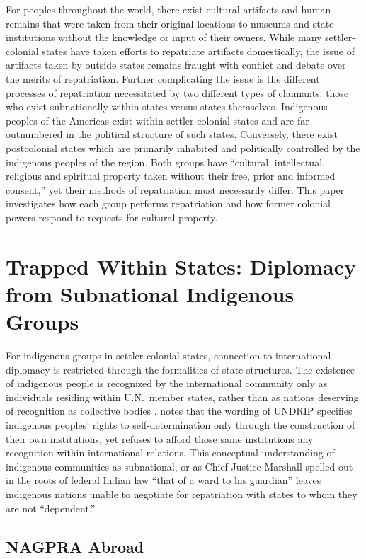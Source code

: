 \documentclass[american]{../../../coursework}
\begin{document}
For peoples throughout the world, there exist cultural artifacts and human
remains that were taken from their original locations to museums and state
institutions without the knowledge or input of their owners. While many
settler-colonial states have taken efforts to repatriate artifacts
domestically, the issue of artifacts taken by outside states remains fraught
with conflict and debate over the merits of repatriation. Further complicating
the issue is the different processes of repatriation necessitated by two
different types of claimants: those who exist subnationally within states
versus states themselves. Indigenous peoples of the Americas exist within
settler-colonial states and are far outnumbered in the political structure of
such states. Conversely, there exist postcolonial states which are primarily
inhabited and politically controlled by the indigenous peoples of the region.
Both groups have ``cultural, intellectual, religious and spiritual property
taken without their free, prior and informed consent,'' yet their methods of
repatriation must necessarily differ. This paper investigates how each group
performs repatriation and how former colonial powers respond to requests for
cultural property.

\section{Trapped Within States: Diplomacy from Subnational Indigenous Groups}

For indigenous groups in settler-colonial states, connection to international
diplomacy is restricted through the formalities of state structures. The
existence of indigenous people is recognized by the international community
only as individuals residing within U.N.\ member states, rather than as
nations deserving of recognition as collective bodies \parencite{Sch12}.
\textcite{Car12} notes that the wording of UNDRIP specifies indigenous
peoples' rights to self-determination only through the construction of their
own institutions, yet refuses to afford those same institutions any
recognition within international relations. This conceptual understanding of
indigenous communities as subnational, or as Chief Justice Marshall spelled
out in the roots of federal Indian law ``that of a ward to his guardian''
\parencite[2]{The31} leaves indigenous nations unable to negotiate for
repatriation with states to whom they are not ``dependent.''

\subsection{NAGPRA Abroad}
\end{document}
